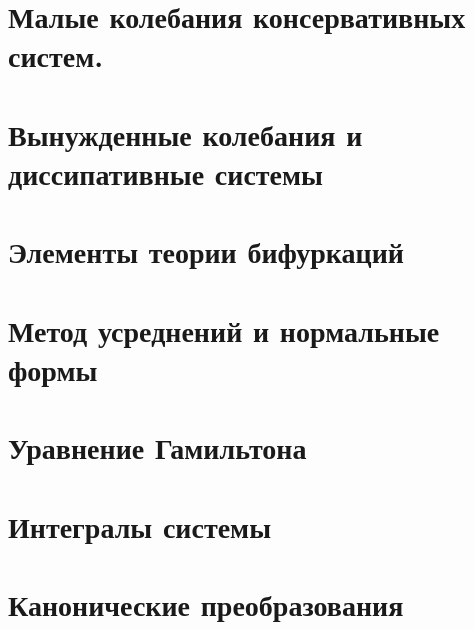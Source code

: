 


\section{Малые колебания консервативных систем.}


\section{Вынужденные колебания и диссипативные системы}


\section{Элементы теории бифуркаций}


\section{Метод усреднений и нормальные формы}


\section{Уравнение Гамильтона}


\section{Интегралы системы}


\section{Канонические преобразования}











   
 



